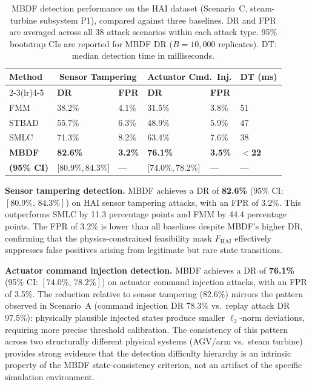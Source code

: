 \documentclass[manuscript,screen,review]{acmart}
\begin{document}
\begin{table}[!t]
\renewcommand{\arraystretch}{1.3}
\caption{MBDF detection performance on the HAI dataset
(Scenario~C, steam-turbine subsystem P1), compared
against three baselines. DR and FPR are averaged across
all 38 attack scenarios within each attack type.
95\% bootstrap CIs are reported for MBDF DR
($B = 10{,}000$ replicates).
DT: median detection time in milliseconds.}
\label{tab:hai_results}
\centering
\small
\begin{tabular}{llllll}
\toprule
\textbf{Method} &
\multicolumn{2}{c}{\textbf{Sensor Tampering}} &
\multicolumn{2}{c}{\textbf{Actuator Cmd.\ Inj.}} &
\textbf{DT (ms)} \\
\cmidrule(lr){2-3}\cmidrule(lr){4-5}
& \textbf{DR} & \textbf{FPR}
& \textbf{DR} & \textbf{FPR} & \\
\midrule
FMM   & 38.2\% & 4.1\% & 31.5\% & 3.8\% & 51 \\
STBAD & 55.7\% & 6.3\% & 48.9\% & 5.9\% & 47 \\
SMLC  & 71.3\% & 8.2\% & 63.4\% & 7.6\% & 38 \\
\midrule
\textbf{MBDF} &
  \textbf{82.6\%} & \textbf{3.2\%} &
  \textbf{76.1\%} & \textbf{3.5\%} &
  \textbf{$<$22} \\
\textbf{(95\% CI)} &
  {[80.9\%,\,84.3\%]} & --- &
  {[74.0\%,\,78.2\%]} & --- & --- \\
\bottomrule
\end{tabular}
\end{table}

\textbf{Sensor tampering detection.}
MBDF achieves a DR of \textbf{82.6\%} (95\% CI:
$[80.9\%,\,84.3\%]$) on HAI sensor tampering attacks,
with an FPR of 3.2\%. This outperforms SMLC by
11.3 percentage points and FMM by 44.4 percentage points.
The FPR of 3.2\% is lower than all baselines despite
MBDF's higher DR, confirming that the physics-constrained
feasibility mask $F_{\mathrm{HAI}}$ effectively suppresses
false positives arising from legitimate but rare state
transitions.

\textbf{Actuator command injection detection.}
MBDF achieves a DR of \textbf{76.1\%} (95\% CI:
$[74.0\%,\,78.2\%]$) on actuator command injection
attacks, with an FPR of 3.5\%. The reduction relative
to sensor tampering (82.6\%) mirrors the pattern observed
in Scenario~A (command injection DR 78.3\% vs.\ replay
attack DR 97.5\%): physically plausible injected states
produce smaller $\ell_2$-norm deviations, requiring more
precise threshold calibration. The consistency of this
pattern across two structurally different physical systems
(AGV/arm vs.\ steam turbine) provides strong evidence
that the detection difficulty hierarchy is an intrinsic
property of the MBDF state-consistency criterion, not an
artifact of the specific simulation environment.
\end{document}
